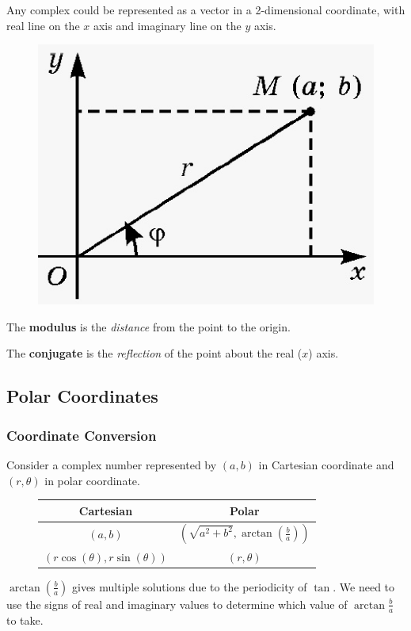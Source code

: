 \documentclass[11pt]{article}
\begin{document}
	\par Any complex could be represented as a vector in a 2-dimensional coordinate, with real line on the $x$ axis and imaginary line on the $y$ axis.
	\begin{figure}[h]
		\centering
		\includegraphics[width=0.4\linewidth]{figures/49_polar_representation_of_complex_number}
	\end{figure}
	\begin{remark}
		The \textbf{modulus} is the \emph{distance} from the point to the origin.
	\end{remark}
	\begin{remark}
		The \textbf{conjugate} is the \emph{reflection} of the point about the real ($x$) axis.
	\end{remark}
	
	
	\subsection{Polar Coordinates}
	\subsubsection{Coordinate Conversion}
		\par Consider a complex number represented by $(a,b)$ in Cartesian coordinate and $(r, \theta)$ in polar coordinate.
		\begin{figure}[h]
			\centering
			\begin{tabular}{|c|c|}
				\hline
				Cartesian & Polar \\
				\hline
				$(a, b)$ & $(\sqrt{a^2 + b^2}, \arctan(\frac{b}{a}))$ \\
				\hline
				$(r \cos(\theta), r \sin(\theta))$ & $(r, \theta)$ \\
				\hline
			\end{tabular}
		\end{figure}
		\begin{remark}
			$\arctan(\frac{b}{a})$ gives multiple solutions due to the periodicity of $\tan$. We need to use the signs of real and imaginary values to determine which value of $\arctan{\frac{b}{a}}$ to take.
		\end{remark}
		
\end{document}
